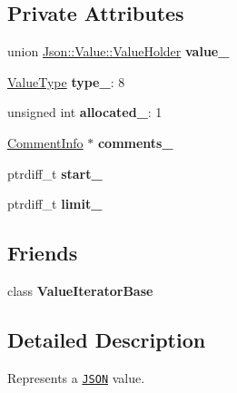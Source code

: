 \subsection*{Private Attributes}
\begin{DoxyCompactItemize}
\item 
\mbox{\label{classJson_1_1Value_aef578244546212705b9f81eb84d7e151}} 
union \hyperlink{unionJson_1_1Value_1_1ValueHolder}{Json\+::\+Value\+::\+Value\+Holder} {\bfseries value\+\_\+}
\item 
\mbox{\label{classJson_1_1Value_abd222c2536dc88bf330dedcd076d2356}} 
\hyperlink{namespaceJson_a7d654b75c16a57007925868e38212b4e}{Value\+Type} {\bfseries type\+\_\+}\+: 8
\item 
\mbox{\label{classJson_1_1Value_ae0126c80dc4907aad94088553fc7632b}} 
unsigned int {\bfseries allocated\+\_\+}\+: 1
\item 
\mbox{\label{classJson_1_1Value_a2016564cabc7a29208e97bd0b782a4e4}} 
\hyperlink{structJson_1_1Value_1_1CommentInfo}{Comment\+Info} $\ast$ {\bfseries comments\+\_\+}
\item 
\mbox{\label{classJson_1_1Value_a1c3aeb0fa8fefe93776cb347c76a25a8}} 
ptrdiff\+\_\+t {\bfseries start\+\_\+}
\item 
\mbox{\label{classJson_1_1Value_afe377e25f6d3b5b8ea7221c84f29412a}} 
ptrdiff\+\_\+t {\bfseries limit\+\_\+}
\end{DoxyCompactItemize}
\subsection*{Friends}
\begin{DoxyCompactItemize}
\item 
\mbox{\label{classJson_1_1Value_ad016df56489e5d360735457afba2f649}} 
class {\bfseries Value\+Iterator\+Base}
\end{DoxyCompactItemize}


\subsection{Detailed Description}
Represents a \href{http://www.json.org}{\tt J\+S\+ON} value. 

